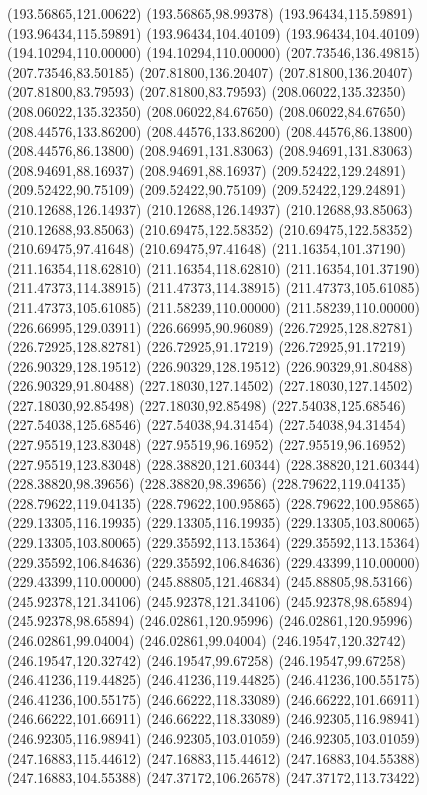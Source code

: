 {(193.56865,121.00622) (193.56865,98.99378) (193.96434,115.59891) (193.96434,115.59891) (193.96434,104.40109) (193.96434,104.40109) (194.10294,110.00000) (194.10294,110.00000)
(207.73546,136.49815) (207.73546,83.50185) (207.81800,136.20407) (207.81800,136.20407) (207.81800,83.79593) (207.81800,83.79593) (208.06022,135.32350) (208.06022,135.32350)
(208.06022,84.67650) (208.06022,84.67650) (208.44576,133.86200) (208.44576,133.86200) (208.44576,86.13800) (208.44576,86.13800) (208.94691,131.83063) (208.94691,131.83063)
(208.94691,88.16937) (208.94691,88.16937) (209.52422,129.24891) (209.52422,90.75109) (209.52422,90.75109) (209.52422,129.24891) (210.12688,126.14937) (210.12688,126.14937)
(210.12688,93.85063) (210.12688,93.85063) (210.69475,122.58352) (210.69475,122.58352) (210.69475,97.41648) (210.69475,97.41648) (211.16354,101.37190) (211.16354,118.62810)
(211.16354,118.62810) (211.16354,101.37190) (211.47373,114.38915) (211.47373,114.38915) (211.47373,105.61085) (211.47373,105.61085) (211.58239,110.00000) (211.58239,110.00000)
(226.66995,129.03911) (226.66995,90.96089) (226.72925,128.82781) (226.72925,128.82781) (226.72925,91.17219) (226.72925,91.17219) (226.90329,128.19512) (226.90329,128.19512)
(226.90329,91.80488) (226.90329,91.80488) (227.18030,127.14502) (227.18030,127.14502) (227.18030,92.85498) (227.18030,92.85498) (227.54038,125.68546) (227.54038,125.68546)
(227.54038,94.31454) (227.54038,94.31454) (227.95519,123.83048) (227.95519,96.16952) (227.95519,96.16952) (227.95519,123.83048) (228.38820,121.60344) (228.38820,121.60344)
(228.38820,98.39656) (228.38820,98.39656) (228.79622,119.04135) (228.79622,119.04135) (228.79622,100.95865) (228.79622,100.95865) (229.13305,116.19935) (229.13305,116.19935)
(229.13305,103.80065) (229.13305,103.80065) (229.35592,113.15364) (229.35592,113.15364) (229.35592,106.84636) (229.35592,106.84636) (229.43399,110.00000) (229.43399,110.00000)
(245.88805,121.46834) (245.88805,98.53166) (245.92378,121.34106) (245.92378,121.34106) (245.92378,98.65894) (245.92378,98.65894) (246.02861,120.95996) (246.02861,120.95996)
(246.02861,99.04004) (246.02861,99.04004) (246.19547,120.32742) (246.19547,120.32742) (246.19547,99.67258) (246.19547,99.67258) (246.41236,119.44825) (246.41236,119.44825)
(246.41236,100.55175) (246.41236,100.55175) (246.66222,118.33089) (246.66222,101.66911) (246.66222,101.66911) (246.66222,118.33089) (246.92305,116.98941) (246.92305,116.98941)
(246.92305,103.01059) (246.92305,103.01059) (247.16883,115.44612) (247.16883,115.44612) (247.16883,104.55388) (247.16883,104.55388) (247.37172,106.26578) (247.37172,113.73422)
}
